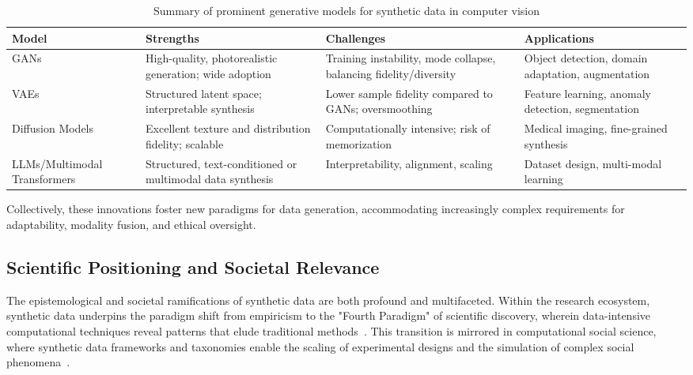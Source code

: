 \begin{table*}[htbp]
\centering
\caption{Summary of prominent generative models for synthetic data in computer vision}
\label{tab:gen_model_summary}
\begin{adjustbox}{max width=\textwidth}
\begin{tabular}{llll}
\toprule
\textbf{Model} & \textbf{Strengths} & \textbf{Challenges} & \textbf{Applications} \\
\midrule
GANs & High-quality, photorealistic generation; wide adoption & Training instability, mode collapse, balancing fidelity/diversity & Object detection, domain adaptation, augmentation \\
VAEs & Structured latent space; interpretable synthesis & Lower sample fidelity compared to GANs; oversmoothing & Feature learning, anomaly detection, segmentation \\
Diffusion Models & Excellent texture and distribution fidelity; scalable & Computationally intensive; risk of memorization & Medical imaging, fine-grained synthesis \\
LLMs/Multimodal Transformers & Structured, text-conditioned or multimodal data synthesis & Interpretability, alignment, scaling & Dataset design, multi-modal learning \\
\bottomrule
\end{tabular}
\end{adjustbox}
\end{table*}

Collectively, these innovations foster new paradigms for data generation, accommodating increasingly complex requirements for adaptability, modality fusion, and ethical oversight.

\subsection{Scientific Positioning and Societal Relevance}

The epistemological and societal ramifications of synthetic data are both profound and multifaceted. Within the research ecosystem, synthetic data underpins the paradigm shift from empiricism to the "Fourth Paradigm" of scientific discovery, wherein data-intensive computational techniques reveal patterns that elude traditional methods~\cite{ref13,ref14,ref33}. This transition is mirrored in computational social science, where synthetic data frameworks and taxonomies enable the scaling of experimental designs and the simulation of complex social phenomena~\cite{ref14,ref22,ref87}.

